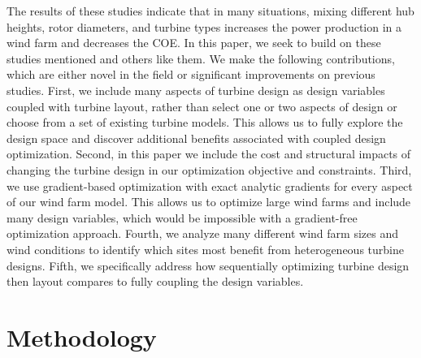\documentclass[wes, manuscript]{copernicus}
\begin{document}
The results of these studies indicate that in many situations, mixing different hub heights, rotor diameters, and turbine types increases the power production in a wind farm and decreases the COE. In this paper, we seek to build on these studies mentioned and others like them.
We make the following contributions, which are either novel in the field or significant improvements on previous studies.
First, we include many aspects of turbine design as design variables coupled with turbine layout, rather than select one or two aspects of design or choose from a set of existing turbine models. This allows us to fully explore the design space and discover additional benefits associated with coupled design optimization.
Second, in this paper we include the cost and structural impacts of changing the turbine design in our optimization objective and constraints.
Third, we use gradient-based optimization with exact analytic gradients for every aspect of our wind farm model. This allows us to optimize large wind farms and include many design variables, which would be impossible with a gradient-free optimization approach.
Fourth, we analyze many different wind farm sizes and wind conditions to identify which sites most benefit from heterogeneous turbine designs.
Fifth, we specifically address how sequentially optimizing turbine design then layout compares to fully coupling the design variables.








\section{Methodology}
\end{document}
